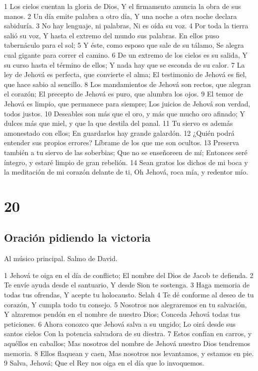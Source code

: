 1 Los cielos cuentan la gloria de Dios,
Y el firmamento anuncia la obra de sus manos.
2 Un día emite palabra a otro día,
Y una noche a otra noche declara sabiduría.
3 No hay lenguaje, ni palabras,
Ni es oída su voz.
4 Por toda la tierra salió su voz,
Y hasta el extremo del mundo sus palabras.
En ellos puso tabernáculo para el sol;
5 Y éste, como esposo que sale de su tálamo,
Se alegra cual gigante para correr el camino.
6 De un extremo de los cielos es su salida,
Y su curso hasta el término de ellos;
Y nada hay que se esconda de su calor.
7 La ley de Jehová es perfecta, que convierte el alma;
El testimonio de Jehová es fiel, que hace sabio al sencillo.
8 Los mandamientos de Jehová son rectos, que alegran el corazón;
El precepto de Jehová es puro, que alumbra los ojos.
9 El temor de Jehová es limpio, que permanece para siempre;
Los juicios de Jehová son verdad, todos justos.
10 Deseables son más que el oro, y más que mucho oro afinado;
Y dulces más que miel, y que la que destila del panal.
11 Tu siervo es además amonestado con ellos;
En guardarlos hay grande galardón.
12 ¿Quién podrá entender sus propios errores?
Líbrame de los que me son ocultos.
13 Preserva también a tu siervo de las soberbias;
Que no se enseñoreen de mí;
Entonces seré íntegro, y estaré limpio de gran rebelión.
14 Sean gratos los dichos de mi boca y la meditación de mi corazón delante de ti,
Oh Jehová, roca mía, y redentor mío.

\chapter{20}

\section*{Oración pidiendo la victoria}

Al músico principal. Salmo de David.

1 Jehová te oiga en el día de conflicto;
El nombre del Dios de Jacob te defienda.
2 Te envíe ayuda desde el santuario,
Y desde Sion te sostenga.
3 Haga memoria de todas tus ofrendas,
Y acepte tu holocausto. Selah
4 Te dé conforme al deseo de tu corazón,
Y cumpla todo tu consejo.
5 Nosotros nos alegraremos en tu salvación,
Y alzaremos pendón en el nombre de nuestro Dios;
Conceda Jehová todas tus peticiones.
6 Ahora conozco que Jehová salva a su ungido;
Lo oirá desde sus santos cielos
Con la potencia salvadora de su diestra.
7 Estos confían en carros, y aquéllos en caballos;
Mas nosotros del nombre de Jehová nuestro Dios tendremos memoria.
8 Ellos flaquean y caen,
Mas nosotros nos levantamos, y estamos en pie.
9 Salva, Jehová;
Que el Rey nos oiga en el día que lo invoquemos.

